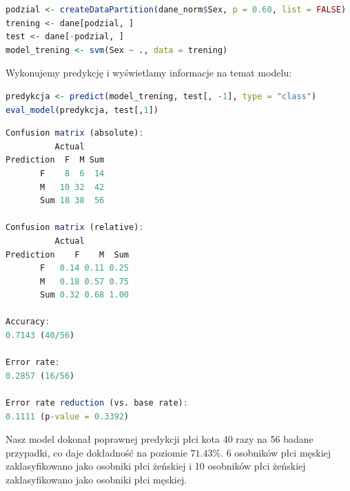 \documentclass[a4paper]{article}
\begin{document}
\begin{lstlisting}[language=R, frame=single]
podzial <- createDataPartition(dane_norm$Sex, p = 0.60, list = FALSE)
trening <- dane[podzial, ] 
test <- dane[-podzial, ]
model_trening <- svm(Sex ~ ., data = trening)
\end{lstlisting}
Wykonujemy predykcję i wyświetlamy informacje na temat modelu:
\begin{lstlisting}[language=R, frame=single]
predykcja <- predict(model_trening, test[, -1], type = "class")
eval_model(predykcja, test[,1])
\end{lstlisting}
\begin{lstlisting}[language=R, frame=single]
Confusion matrix (absolute):
          Actual
Prediction  F  M Sum
       F    8  6  14
       M   10 32  42
       Sum 18 38  56

Confusion matrix (relative):
          Actual
Prediction    F    M  Sum
       F   0.14 0.11 0.25
       M   0.18 0.57 0.75
       Sum 0.32 0.68 1.00

Accuracy:
0.7143 (40/56)

Error rate:
0.2857 (16/56)

Error rate reduction (vs. base rate):
0.1111 (p-value = 0.3392)
\end{lstlisting}
Nasz model dokonał poprawnej predykcji płci kota 40 razy na 56 badane przypadki, co daje dokładność na poziomie $71.43\%$. 6 osobników płci męskiej zaklasyfikowano jako osobniki płci żeńskiej i 10 osobników płci żeńskiej zaklasyfikowano jako osobniki płci męskiej.
\end{document}
